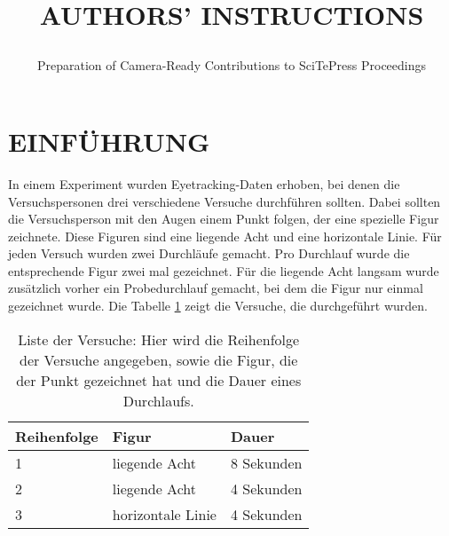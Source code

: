 \documentclass[a4paper,twoside]{article}
\begin{document}
\title{\uppercase{Authors' Instructions}  \subtitle{Preparation of Camera-Ready Contributions to SciTePress Proceedings} }

\author{
}



\onecolumn \maketitle \normalsize \vfill

\section{\uppercase{Einf\"uhrung}}

\noindent 
In einem Experiment wurden Eyetracking-Daten erhoben, bei denen die Versuchspersonen drei verschiedene Versuche durchf\"uhren sollten. Dabei sollten die Versuchsperson mit den Augen einem Punkt folgen, der eine spezielle Figur zeichnete. Diese Figuren sind eine liegende Acht und eine horizontale Linie. F\"ur jeden Versuch wurden zwei Durchl\"aufe gemacht. Pro Durchlauf wurde die entsprechende Figur zwei mal gezeichnet. F\"ur die liegende Acht langsam wurde zus\"atzlich vorher ein Probedurchlauf gemacht, bei dem die Figur nur einmal gezeichnet wurde.
Die Tabelle \ref{tab:Versuche} zeigt die Versuche, die durchgef\"uhrt wurden.

\begin{table}[h]
	\caption{\label{tab:Versuche}Liste der Versuche: Hier wird die Reihenfolge der Versuche angegeben, sowie die Figur, die der Punkt ge\-zeich\-net hat und die Dauer eines Durchlaufs.}
	\noindent \centering{}
	\bgroup
	\def\arraystretch{2}  %
	\begin{tabular}{|l|l|l|}
		\hline 
		\textbf{Reihenfolge} & \textbf{Figur} & \textbf{Dauer}\\
		\hline \hline
		1 & liegende Acht & 8 Sekunden\\
		\hline
		2 & liegende Acht & 4 Sekunden\\
		\hline
		3 & horizontale Linie & 4 Sekunden\\
		\hline
	\end{tabular}
	\egroup
\end{table}
\end{document}
